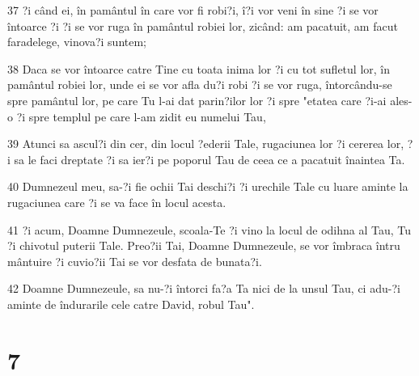 \par 37 ?i când ei, în pamântul în care vor fi robi?i, î?i vor veni în sine ?i se vor întoarce ?i ?i se vor ruga în pamântul robiei lor, zicând: am pacatuit, am facut faradelege, vinova?i suntem;
\par 38 Daca se vor întoarce catre Tine cu toata inima lor ?i cu tot sufletul lor, în pamântul robiei lor, unde ei se vor afla du?i robi ?i se vor ruga, întorcându-se spre pamântul lor, pe care Tu l-ai dat parin?ilor lor ?i spre "etatea care ?i-ai ales-o ?i spre templul pe care l-am zidit eu numelui Tau,
\par 39 Atunci sa ascul?i din cer, din locul ?ederii Tale, rugaciunea lor ?i cererea lor, ?i sa le faci dreptate ?i sa ier?i pe poporul Tau de ceea ce a pacatuit înaintea Ta.
\par 40 Dumnezeul meu, sa-?i fie ochii Tai deschi?i ?i urechile Tale cu luare aminte la rugaciunea care ?i se va face în locul acesta.
\par 41 ?i acum, Doamne Dumnezeule, scoala-Te ?i vino la locul de odihna al Tau, Tu ?i chivotul puterii Tale. Preo?ii Tai, Doamne Dumnezeule, se vor îmbraca întru mântuire ?i cuvio?ii Tai se vor desfata de bunata?i.
\par 42 Doamne Dumnezeule, sa nu-?i întorci fa?a Ta nici de la unsul Tau, ci adu-?i aminte de îndurarile cele catre David, robul Tau".

\chapter{7}

